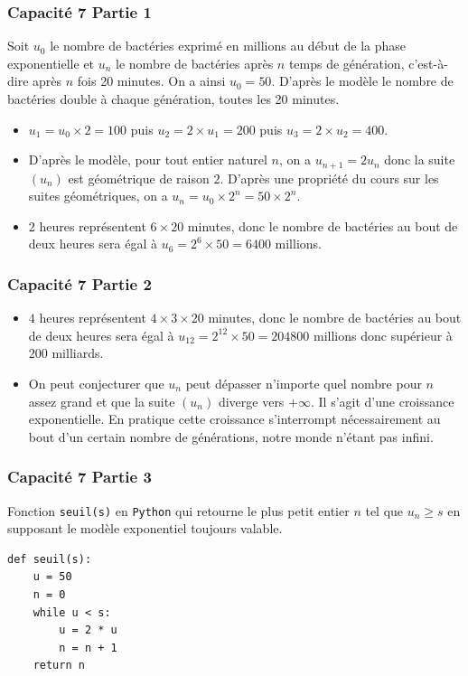 \documentclass[11pt, hyperref={urlcolor=red,%
            linkcolor=blue, %
            colorlinks=true}]{beamer}
\newcommand{\suite}[1]{\ensuremath{\left(#1_{n}\right)}}
\begin{document}
\begin{frame}
\frametitle{Capacité 7 Partie 1}
\label{capacite7}


Soit $u_0$ le nombre de bactéries exprimé en millions au début de la phase
exponentielle et $u_n$ le nombre de bactéries après $n$ temps de génération, c'est-à-dire après $n$ fois 20 minutes. On a ainsi $u_0 = 50$. D'après le modèle le nombre de bactéries double à chaque génération, toutes les 20 minutes.

\begin{itemize}
	\item $u_{1}=u_{0} \times 2 = 100$ puis $u_{2}=2 \times u_{1}=200$ puis $u_{3}=2\times u_{2}=400$.
    \item D'après le modèle, pour tout entier naturel $n$, on a $u_{n+1}=2u_{n}$ donc la suite $\left(u_{n}\right)$ est géométrique de raison $2$.  D'après une propriété du cours sur les suites géométriques, on a $u_{n}=u_{0} \times 2^{n}=50 \times 2^{n}$.
    \item $2$ heures représentent $6 \times 20$ minutes, donc le nombre de bactéries au bout de deux heures sera égal à $u_{6}=2^{6}\times 50 = 6400$  millions.
\end{itemize}


\end{frame}



\begin{frame}
\frametitle{Capacité 7 Partie 2}

\begin{itemize}
    \item $4$ heures représentent $4 \times 3 \times 20$ minutes, donc le nombre de bactéries au bout de deux heures sera égal à $u_{12}=2^{12}\times 50 = 204800$  millions donc supérieur à $200$ milliards.
    
   \item On peut conjecturer que $u_{n}$  peut dépasser n'importe quel nombre pour $n$ assez grand et que la suite $\suite{u}$ diverge vers $+\infty$. Il s'agit d'une croissance exponentielle. En pratique cette croissance s'interrompt nécessairement au bout d'un certain nombre de générations, notre monde n'étant pas infini.
   
\end{itemize}


\end{frame}




\begin{frame}[fragile]
\frametitle{Capacité 7 Partie 3}
Fonction \texttt{seuil(s)}  en  \texttt{Python} qui retourne le plus petit entier $n$ tel que $u_{n} \geqslant s$ en supposant le modèle exponentiel toujours valable.  

\begin{lstlisting}[style=rond]
def seuil(s):
	u = 50
	n = 0
	while u < s:
		u = 2 * u
		n = n + 1
	return n
\end{lstlisting}

\end{frame}
\end{document}
